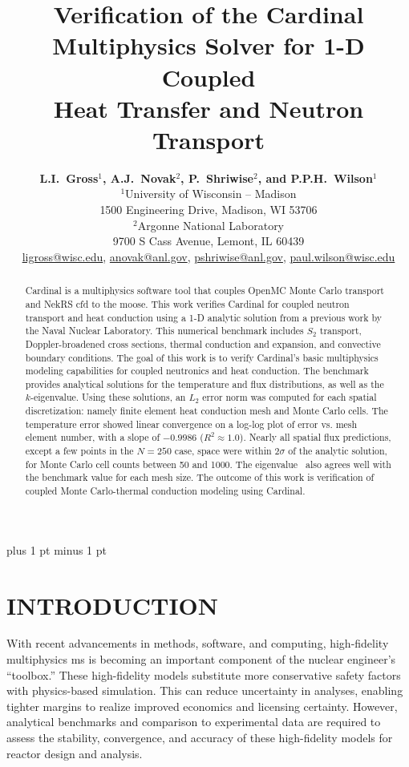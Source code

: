 \documentclass[letterpaper]{mc2023}
\title{Verification of the Cardinal Multiphysics Solver for 1-D Coupled\\
Heat Transfer and Neutron Transport}
\author{%
  \textbf{L.I.~Gross$^1$, A.J.~Novak$^2$, P.~Shriwise$^2$, and P.P.H.~Wilson$^1$}\\
  $^1$University of Wisconsin -- Madison  \\
  1500 Engineering Drive, Madison, WI 53706 \vspace{6pt}\\
  $^2$Argonne National Laboratory \\
  9700 S Cass Avenue, Lemont, IL 60439\vspace{6pt} \\
  \url{ligross@wisc.edu}, \url{anovak@anl.gov}, \url{pshriwise@anl.gov}, \url{paul.wilson@wisc.edu}
}
\begin{document}
\maketitle
\justify
\parskip 6pt plus 1 pt minus 1 pt

\begin{abstract}
Cardinal is a multiphysics software tool that couples OpenMC Monte Carlo transport and NekRS \gls{cfd} to the \gls{moose}. This
work verifies Cardinal for coupled neutron transport and heat conduction using a 1-D analytic solution from a previous work by the
Naval Nuclear Laboratory. This numerical benchmark includes $S_2$ transport, Doppler-broadened cross sections, thermal conduction
and expansion, and convective boundary conditions. The goal of this work is to verify Cardinal's basic multiphysics modeling
capabilities for coupled neutronics and heat conduction. The benchmark provides analytical solutions for the temperature and flux
distributions, as well as the $k$-eigenvalue. Using these solutions, an $L_{2}$ error norm was computed for each spatial discretization:
namely finite element heat conduction mesh and Monte Carlo cells. The temperature error showed linear convergence on a log-log plot of
error vs. mesh element number, with a slope of $-0.9986$ ($R^2\approx 1.0$). Nearly all spatial flux predictions, except a few points
in the $N=250$ case, space were within $2\sigma$ of the analytic solution, for Monte Carlo cell counts between 50 and 1000. The
eigenvalue \keff~also agrees well with the benchmark value for each mesh size. The outcome of this work is verification of coupled
Monte Carlo-thermal conduction modeling using Cardinal.
\end{abstract}
\vspace{6pt}

\section{INTRODUCTION}
\label{sec:intro}
With recent advancements in methods, software, and computing, high-fidelity multiphysics \gls{ms} is becoming an important
component of the nuclear engineer's ``toolbox.'' These high-fidelity models substitute more conservative safety factors
with physics-based simulation. This can reduce uncertainty in analyses, enabling tighter margins to realize improved economics
and licensing certainty. However, analytical benchmarks and comparison to experimental data are required to assess the stability,
convergence, and accuracy of these high-fidelity models for reactor design and analysis.
\end{document}
